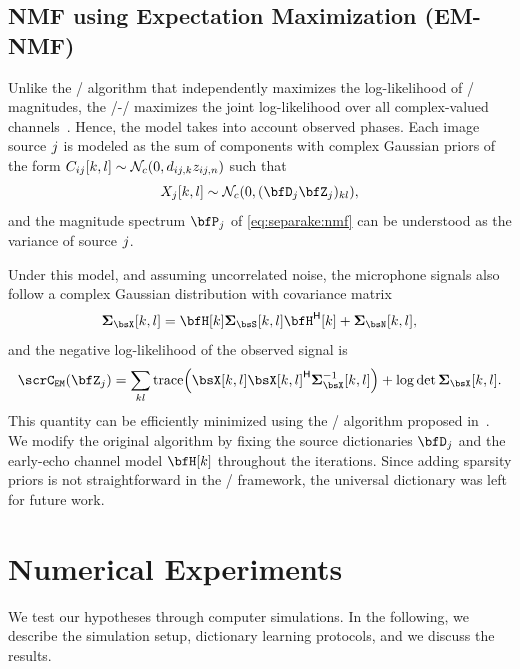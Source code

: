 \subsection{NMF using Expectation Maximization (EM-NMF)}\label{sec:separake:em}
Unlike the \MU/ algorithm that independently maximizes the log-likelihood of \RTF/ magnitudes, the \EM/-\NMF/ maximizes the joint log-likelihood over all complex-valued channels~.
Hence, the model takes into account observed phases.
Each image source $j$ is modeled as the sum of components with complex Gaussian priors of the form $\IMG_{\idxMicSrc}[k,l]\sim \mathcal{N}_c\kparen{0, d_{\idxMicSrc,k}z_{\idxMicSrc,n}}$ such that
\begin{equation}
    \MIC_\idxSrc[k,l] \sim \mathcal{N}_c \kparen{0, (\mD_\idxSrc\mZ_\idxSrc)_{kl}},
\end{equation}
and the magnitude spectrum $\mP_\idxSrc$ of \eqref{eq:separake:nmf} can be understood as the variance of source $j$.

\mynewline
Under this model, and assuming uncorrelated noise, the microphone signals also follow a complex Gaussian distribution with covariance matrix
\begin{equation}
    \mSigma_{\MICS}[k,l] = \FLTSS[k] \mSigma_{\SRCS} [k,l] \khermitian{\FLTSS}[k] + \mSigma_{\NSES}[k,l],
\end{equation}
and the negative log-likelihood of the observed signal is
\begin{equation}
    \scrC_{\mathtt{EM}}(\mZ_\idxSrc) = \sum\limits_{kl} \trace\kparen{\MICS[k,l] \khermitian{\MICS[k,l]} \mSigma_{\MICS}^{-1}[k,l]} \\
    + \log\det\mSigma_{\MICS}[k,l].
\end{equation}
This quantity can be efficiently minimized using the \EM/ algorithm proposed in~.
We modify the original algorithm by fixing the source dictionaries $\mD_\idxSrc$ and the early-echo channel model $\FLTSS[k]$ throughout the iterations.
Since adding sparsity priors is not straightforward in the \EM/ framework, the universal dictionary was left for future work.

\section{Numerical Experiments}

We test our hypotheses through computer simulations.
In the following, we describe the simulation setup, dictionary learning protocols, and we discuss the results.

